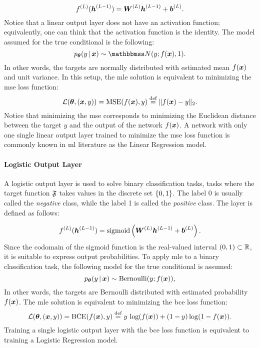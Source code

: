 $$\Layer{f}{L}(\LayerVector{h}{L-1}) = \LayerMatrix{W}{L} \LayerVector{h}{L-1} + \LayerVector{b}{L}.$$
Notice that a linear output layer does not have an activation function; equivalently, one can think that the activation function is the identity. The model assumed for the true conditional is the following:
$$p_{\Param}(y \given \Vector{x}) \sim \Normal{y; f(\Vector{x})}{1}.$$
In other words, the targets are normally distributed with estimated mean $f(\Vector{x})$ and unit variance. In this setup, the \gls{mle} solution is equivalent to minimizing the \gls{mse} loss function:
$$\Loss(\Param, (\Vector{x}, y)) =\Fun{MSE}(f(\Vector{x}), y) \defeq \norm{ f(\Vector{x}) - y}_2.$$
Notice that minimizing the \gls{mse} corresponds to minimizing the Euclidean distance between the target $y$ and the output of the network $f(\Vector{x})$. A network with only one single linear output layer trained to minimize the \gls{mse} loss function is commonly known in \gls{ml} literature as the Linear Regression model.

\paragraph{Logistic Output Layer}
A logistic output layer is used to solve binary classification tasks, \ie tasks where the target function $\mathfrak{F}$ takes values in the discrete set $\left\{ 0, 1 \right\}$. The label 0 is usually called the \emph{negative} class, while the label 1 is called the \emph{positive} class. The layer is defined as follows:

$$\Layer{f}{L}(\LayerVector{h}{L-1}) = \sigmoid \Par{\LayerMatrix{W}{L} \LayerVector{h}{L-1} + \LayerVector{b}{L}}.$$
Since the codomain of the sigmoid function is the real-valued interval $(0, 1) \subset \mathbb{R}$, it is suitable to express output probabilities. To apply \gls{mle} to a binary classification task, the following model for the true conditional is assumed:
$$p_{\Param}(y \given \Vector{x}) \sim \Fun{Bernoulli}(y; f(\Vector{x})),$$
In other words, the targets are Bernoulli distributed with estimated probability $f(\Vector{x})$. The \gls{mle} solution is equivalent to minimizing the \gls{bce} loss function:
$$\Loss(\Param, (\Vector{x}, y)) = \Fun{BCE}(f(\Vector{x}),y) \defeq y\, \log( f(\Vector{x})) + ( 1 - y) \log(1 -  f(\Vector{x})).$$
Training a single logistic output layer with the \gls{bce} loss function is equivalent to training a Logistic Regression model.

